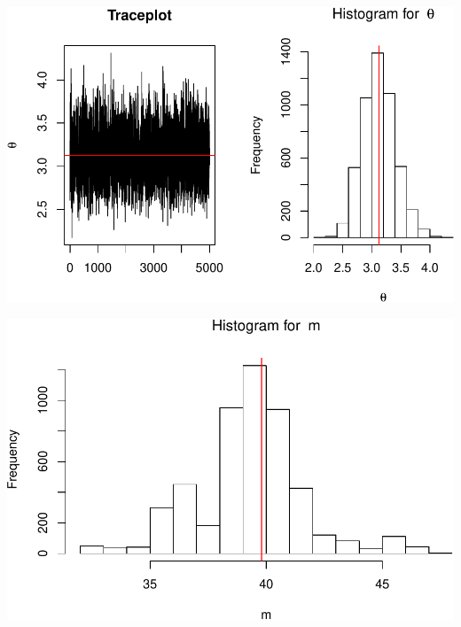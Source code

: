 \documentclass[]{article}
\begin{document}
\includegraphics{AMS206b_H4_files/figure-latex/unnamed-chunk-35-1.pdf}

\includegraphics{AMS206b_H4_files/figure-latex/unnamed-chunk-36-1.pdf}
\end{document}
